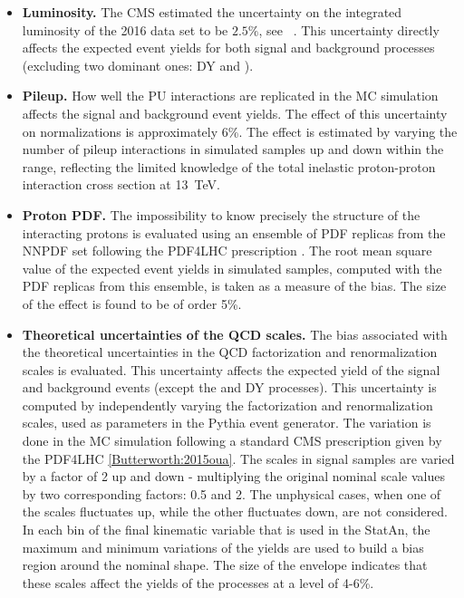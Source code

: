 \begin{itemize}

\item{\bf Luminosity.} 
The CMS estimated the uncertainty on the integrated luminosity of the 2016 data set to be $2.5\%$, see ~\cite{CMS-PAS-LUM-17-001}. This uncertainty directly affects the expected event yields for both signal and background processes (excluding two dominant ones: DY and \ttbar).

\item{\bf Pileup.} 
How well the PU interactions are replicated in the MC simulation affects the signal and background event yields. The effect of this uncertainty on normalizations is approximately 6\%. The effect is estimated by varying the number of pileup interactions in simulated samples up and down within the range, reflecting the limited knowledge of the total inelastic proton-proton interaction cross section at 13~TeV. 

\item{\bf Proton PDF.} 
The impossibility to know precisely the structure of the interacting protons is evaluated using an ensemble of PDF replicas from the NNPDF set \cite{Ball:2014uwa} following the PDF4LHC prescription \cite{Botje:2011sn,Alekhin:2011sk}. The root mean square value of the expected event yields in simulated samples, computed with the PDF replicas from this ensemble, is taken as a measure of the bias. The size of the effect is found to be of order 5\%. 

\item{\bf Theoretical uncertainties of the QCD scales.} 
The bias associated with the theoretical uncertainties in the QCD factorization and renormalization scales is evaluated. This uncertainty affects the expected yield of the signal and background events (except the \ttbar and DY processes). This uncertainty is computed by independently varying the factorization and renormalization scales, used as parameters in the Pythia event generator. The variation is done in the MC simulation following a standard CMS prescription given by the PDF4LHC \ref{Butterworth:2015oua}. The scales in signal samples are varied by a factor of 2 up and down - multiplying the original nominal scale values by two corresponding factors: 0.5 and 2. The unphysical cases, when one of the scales fluctuates up, while the other fluctuates down, are not considered. In each bin of the final kinematic variable that is used in the StatAn, the maximum and minimum variations of the yields are used to build a bias region around the nominal shape. The size of the envelope indicates that these scales affect the yields of the processes at a level of 4-6\%.


\end{itemize}
